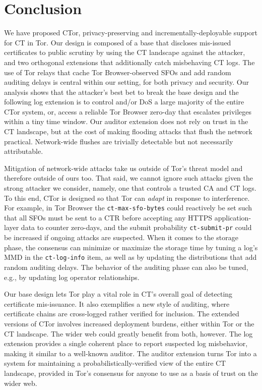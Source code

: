 \section{Conclusion} \label{sec:conclusion} 

We have proposed CTor, privacy-preserving and incrementally-deployable support
for CT in Tor.  Our design is composed of a base that discloses mis-issued
certificates to public scrutiny by using the CT landscape against the attacker,
and two orthogonal extensions that additionally catch misbehaving CT logs.  The
use of Tor relays that cache Tor Browser-observed SFOs and add random auditing delays is
central within our setting, for both privacy and security.  Our analysis shows
that the attacker's best bet to break the base design and the following log
extension is to control and/or DoS a large majority of the entire CTor system,
or, access a reliable Tor Browser zero-day that escalates privileges within a tiny time
window.  Our auditor extension does not rely on trust in the CT landscape, but
at the cost of making flooding attacks that flush the network practical.
Network-wide flushes are trivially detectable but not necessarily attributable.

Mitigation of network-wide attacks take us outside of Tor's threat model and
therefore outside of ours too.  That said, we cannot ignore such attacks given
the strong attacker we consider, namely, one that controls a trusted CA and
CT logs.  To this end, CTor is designed so that Tor can \emph{adapt} in response
to interference.  For example, in Tor Browser the \texttt{ct-max-sfo-bytes} could
reactively be set such that all SFOs must be sent to a CTR before accepting any
HTTPS application-layer data to counter zero-days, and the submit probability
\texttt{ct-submit-pr} could be increased if ongoing attacks are suspected.  When
it comes to the storage phase, the consensus can minimize or maximize the
storage time by tuning a log's MMD in the \texttt{ct-log-info} item, as well as
by updating the distributions that add random auditing delays.  
The behavior of the
auditing phase can also be tuned, e.g., by updating log operator relationships.

Our base design lets Tor play a vital role in CT's overall goal of detecting
certificate mis-issuance.  It also exemplifies a new style of auditing, where
certificate chains are cross-logged rather verified for inclusion.  The extended
versions of CTor involves increased deployment burdens, either within Tor or the
CT landscape.  The wider web could greatly benefit from both, however.  The log
extension provides a single coherent place to report suspected log misbehavior,
making it similar to a well-known auditor.  The auditor extension turns Tor into
a system for maintaining a probabilistically-verified view of the entire CT
landscape, provided in Tor's consensus for anyone to use as a basis of trust on
the wider web.
